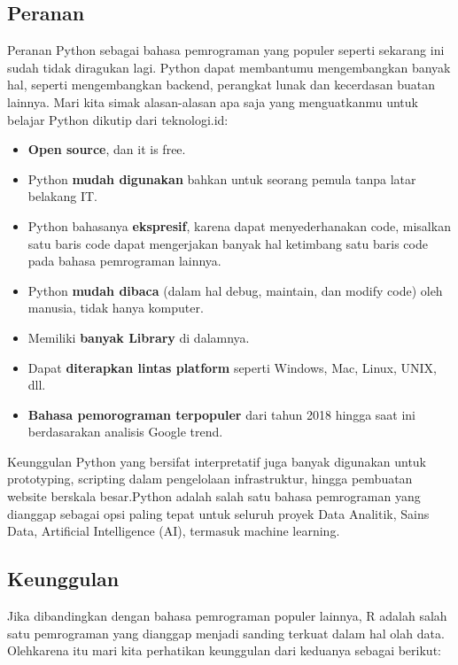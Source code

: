 \documentclass[
]{docs}
\providecommand{\tightlist}{%
  \setlength{\itemsep}{0pt}\setlength{\parskip}{0pt}}
\begin{document}
\hypertarget{peranan}{%
\subsection{Peranan}\label{peranan}}

Peranan Python sebagai bahasa pemrograman yang populer seperti sekarang ini sudah tidak diragukan lagi. Python dapat membantumu mengembangkan banyak hal, seperti mengembangkan backend, perangkat lunak dan kecerdasan buatan lainnya. Mari kita simak alasan-alasan apa saja yang menguatkanmu untuk belajar Python dikutip dari teknologi.id:

\begin{itemize}
\tightlist
\item
  \textbf{Open source}, dan it is free.
\item
  Python \textbf{mudah digunakan} bahkan untuk seorang pemula tanpa latar belakang IT.
\item
  Python bahasanya \textbf{ekspresif}, karena dapat menyederhanakan code, misalkan satu baris code dapat mengerjakan banyak hal ketimbang satu baris code pada bahasa pemrograman lainnya.
\item
  Python \textbf{mudah dibaca} (dalam hal debug, maintain, dan modify code) oleh manusia, tidak hanya komputer.
\item
  Memiliki \textbf{banyak Library} di dalamnya.
\item
  Dapat \textbf{diterapkan lintas platform} seperti Windows, Mac, Linux, UNIX, dll.
\item
  \textbf{Bahasa pemorograman terpopuler} dari tahun 2018 hingga saat ini berdasarakan analisis Google trend.
\end{itemize}

Keunggulan Python yang bersifat interpretatif juga banyak digunakan untuk prototyping, scripting dalam pengelolaan infrastruktur, hingga pembuatan website berskala besar.Python adalah salah satu bahasa pemrograman yang dianggap sebagai opsi paling tepat untuk seluruh proyek Data Analitik, Sains Data, Artificial Intelligence (AI), termasuk machine learning.

\hypertarget{keunggulan}{%
\subsection{Keunggulan}\label{keunggulan}}

Jika dibandingkan dengan bahasa pemrograman populer lainnya, R adalah salah satu pemrograman yang dianggap menjadi sanding terkuat dalam hal olah data. Olehkarena itu mari kita perhatikan keunggulan dari keduanya sebagai berikut:
\end{document}
